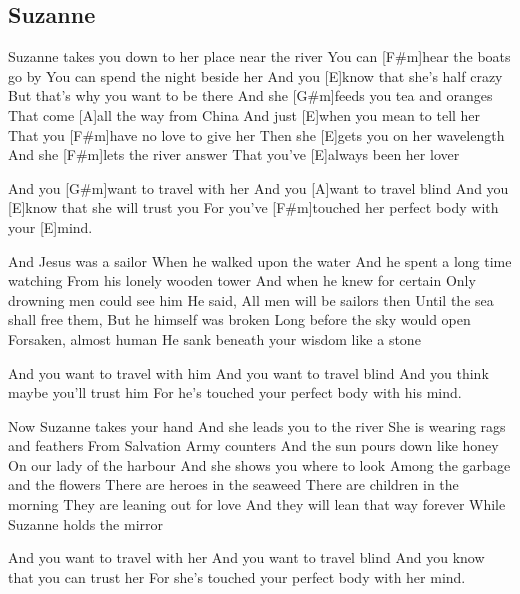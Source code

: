 \subsection*{Suzanne   }
\begin{guitar}
[E]Suzanne takes you down to her place near the river
You can [F#m]hear the boats go by
You can spend the night beside her
And you [E]know that she's half crazy
But that's why you want to be there
And she [G#m]feeds you tea and oranges
That come [A]all the way from China
And just [E]when you mean to tell her
That you [F#m]have no love to give her
Then she [E]gets you on her wavelength
And she [F#m]lets the river answer
That you've [E]always been her lover

And you [G#m]want to travel with her
And you [A]want to travel blind
And you [E]know that she will trust you
For you've [F#m]touched her perfect body with your [E]mind.


And Jesus was a sailor
When he walked upon the water
And he spent a long time watching
From his lonely wooden tower
And when he knew for certain
Only drowning men could see him
He said, All men will be sailors then
Until the sea shall free them,
But he himself was broken
Long before the sky would open
Forsaken, almost human
He sank beneath your wisdom like a stone

And you want to travel with him
And you want to travel blind
And you think maybe you'll trust him
For he's touched your perfect body with his mind.

Now Suzanne takes your hand
And she leads you to the river
She is wearing rags and feathers
From Salvation Army counters
And the sun pours down like honey
On our lady of the harbour
And she shows you where to look
Among the garbage and the flowers
There are heroes in the seaweed
There are children in the morning
They are leaning out for love
And they will lean that way forever
While Suzanne holds the mirror

And you want to travel with her
And you want to travel blind
And you know that you can trust her
For she's touched your perfect body with her mind.
\end{guitar}
